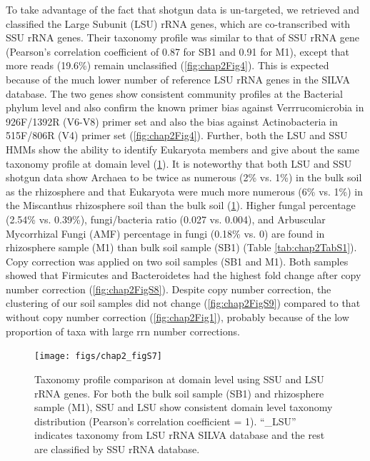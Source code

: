 \documentclass[]{msu-thesis}
\begin{document}
To take advantage of the fact that shotgun data is un-targeted, we retrieved and classified the Large Subunit (LSU) rRNA genes, which are co-transcribed with SSU rRNA genes. Their taxonomy profile was similar to that of SSU rRNA gene (Pearson’s correlation coefficient of 0.87 for SB1 and 0.91 for M1), except that more reads (19.6\%) remain unclassified (\cref{fig:chap2Fig4}). This is expected because of the much lower number of reference LSU rRNA genes in the SILVA database. The two genes show consistent community profiles at the Bacterial phylum level and also confirm the known primer bias against Verrrucomicrobia in 926F/1392R (V6-V8) primer set and also the bias against Actinobacteria in 515F/806R (V4) primer set (\cref{fig:chap2Fig4}). Further, both the LSU and SSU HMMs show the ability to identify Eukaryota members and give about the same taxonomy profile at domain level (\cref{fig:chap2FigS7}). It is noteworthy that both LSU and SSU shotgun data show Archaea to be twice as numerous (2\% vs. 1\%) in the bulk soil as the rhizosphere and that Eukaryota were much more numerous (6\% vs. 1\%) in the Miscanthus rhizosphere soil than the bulk soil (\cref{fig:chap2FigS7}). Higher fungal percentage (2.54\% vs. 0.39\%), fungi/bacteria ratio (0.027 vs. 0.004), and Arbuscular Mycorrhizal Fungi (AMF) percentage in fungi (0.18\% vs. 0) are found in rhizosphere sample (M1) than bulk soil sample (SB1) (Table \ref{tab:chap2TabS1}). Copy correction was applied on two soil samples (SB1 and M1). Both samples showed that Firmicutes and Bacteroidetes had the highest fold change after copy number correction (\cref{fig:chap2FigS8}). Despite copy number correction, the clustering of our soil samples did not change (\cref{fig:chap2FigS9}) compared to that without copy number correction (\cref{fig:chap2Fig1}), probably because of the low proportion of taxa with large rrn number corrections.


\begin{figure}[tbph!]
  \centering
  \texttt{[image: figs/chap2\_figS7]}
  \caption[Taxonomy profile comparison at domain level using SSU and LSU rRNA genes]{Taxonomy profile comparison at domain level using SSU and LSU rRNA genes. For both the bulk soil sample (SB1) and rhizosphere sample (M1), SSU and LSU show consistent domain level taxonomy distribution (Pearson’s correlation coefficient = 1). ``\_LSU'' indicates taxonomy from LSU rRNA SILVA database and the rest are classified by SSU rRNA database.}
  \label{fig:chap2FigS7}
\end{figure}
\end{document}

